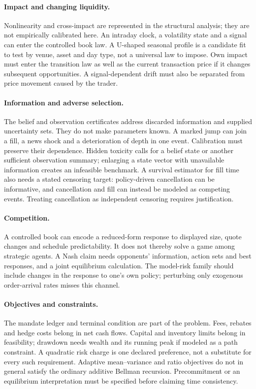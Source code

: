 \paragraph{Impact and changing liquidity.}
Nonlinearity and cross-impact are represented in the structural analysis;
they are not empirically calibrated here. An intraday clock, a volatility
state and a signal can enter the controlled book law. A U-shaped seasonal
profile is a candidate fit to test by venue, asset and day type, not a
universal law to impose. Own impact must enter the transition law as well
as the current transaction price if it changes subsequent opportunities.
A signal-dependent drift must also be separated from price movement
caused by the trader.

\paragraph{Information and adverse selection.}
The belief and observation certificates address discarded information and
supplied uncertainty sets. They do not make parameters known. A marked
jump can join a fill, a news shock and a deterioration of depth in one
event. Calibration must preserve their dependence. Hidden toxicity calls
for a belief state or another sufficient observation summary; enlarging a
state vector with unavailable information creates an infeasible benchmark.
A survival estimator for fill time also needs a stated censoring target:
policy-driven cancellation can be informative, and cancellation and fill
can instead be modeled as competing events. Treating cancellation as
independent censoring requires justification.

\paragraph{Competition.}
A controlled book can encode a reduced-form response to displayed size,
quote changes and schedule predictability. It does not thereby solve a
game among strategic agents. A Nash claim needs opponents' information,
action sets and best responses, and a joint equilibrium calculation.
The model-risk family should include changes in the response to one's own
policy; perturbing only exogenous order-arrival rates misses this channel.

\paragraph{Objectives and constraints.}
The mandate ledger and terminal condition are part of the problem.
Fees, rebates and hedge costs belong in net cash flows. Capital and
inventory limits belong in feasibility; drawdown needs wealth and its
running peak if modeled as a path constraint. A quadratic risk charge is
one declared preference, not a substitute for every such requirement.
Adaptive mean--variance and ratio objectives do not in general satisfy the
ordinary additive Bellman recursion. Precommitment or an equilibrium
interpretation must be specified before claiming time consistency.

